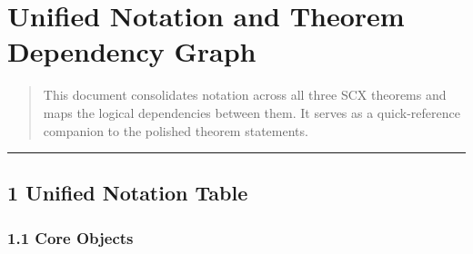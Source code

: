 \documentclass[
  12pt,
]{ctexart}
\author{SCX}
\date{2026}
\begin{document}
\section{Unified Notation and Theorem Dependency
Graph}\label{unified-notation-and-theorem-dependency-graph}

\begin{quote}
This document consolidates notation across all three SCX theorems and
maps the logical dependencies between them. It serves as a
quick-reference companion to the polished theorem statements.
\end{quote}

\begin{center}\rule{0.5\linewidth}{0.5pt}\end{center}

\subsection{1 Unified Notation Table}\label{unified-notation-table}

\subsubsection{1.1 Core Objects}\label{core-objects}
\end{document}
